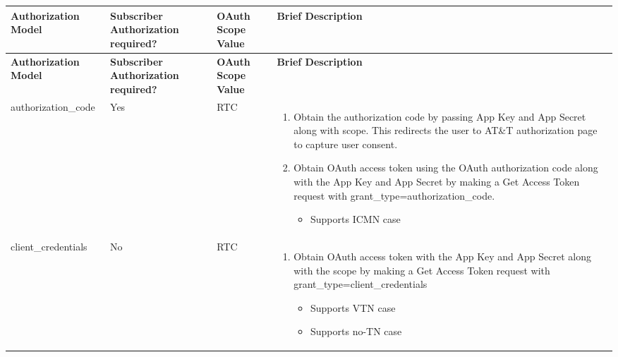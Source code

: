 \begin{comment}
Describe OAuth model applicable to this operation.
\end{comment}


\begin{longtable}{|>{\raggedright}p{}|>{\raggedright}p{}|>{\raggedright}p{}|>{\raggedright}p{}|}
\hline
\hline 
\textbf{\footnotesize{Authorization Model}} & \textbf{\footnotesize{Subscriber Authorization required?}} & \textbf{\footnotesize{OAuth Scope Value}} & \textbf{\footnotesize{Brief Description}}\tabularnewline
\hline 
\hline
\endfirsthead
\hline
\hline 
\textbf{\footnotesize{Authorization Model}} & \textbf{\footnotesize{Subscriber Authorization required?}} & \textbf{\footnotesize{OAuth Scope Value}} & \textbf{\footnotesize{Brief Description}}\tabularnewline
\hline 
\hline
\endhead
\hline 
{\footnotesize{authorization\_code}} & {\footnotesize{Yes}} & {\footnotesize{RTC}} & \begin{enumerate}
\item {\footnotesize{Obtain the authorization code by passing App Key and
App Secret along with scope. This redirects the user to AT\&T authorization
page to capture user consent.}}{\footnotesize \par}
\item {\footnotesize{Obtain OAuth access token using the OAuth authorization
code along with the App Key and App Secret by making a Get Access
Token request with grant\_type=authorization\_code.}}{\footnotesize \par}

\begin{itemize}
\item {\footnotesize{Supports ICMN case}}\end{itemize}
\end{enumerate}
\tabularnewline
\hline 
{\footnotesize{client\_credentials}} & {\footnotesize{No}} & {\footnotesize{RTC}} & \begin{enumerate}
\item {\footnotesize{Obtain OAuth access token with the App Key and App
Secret along with the scope by making a Get Access Token request with
grant\_type=client\_credentials}}{\footnotesize \par}

\begin{itemize}
\item {\footnotesize{Supports VTN case }}{\footnotesize \par}
\item {\footnotesize{Supports no-TN case }}\end{itemize}
\end{enumerate}
\tabularnewline
\hline 
\end{longtable}
